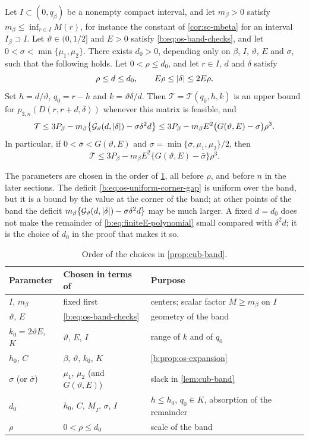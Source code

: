 \begin{proposition}\label{prop:cub-band}
Let $I\subset(0,q_\beta)$ be a nonempty compact interval, and let $m_\beta>0$
satisfy $m_\beta\le\inf_{r\in I}M(r)$, for instance the constant of
\cref{cor:sc-mbeta} for an interval $I_\beta\supset I$. Let $\vartheta\in(0,1/2]$ and
$E>0$ satisfy \eqref{b:eq:os-band-checks}, and let $0<\sigma<\min\{\mu_1,\mu_2\}$.
There exists $d_0>0$, depending only on $\beta$, $I$, $\vartheta$, $E$ and $\sigma$,
such that the following holds. Let $0<\rho\le d_0$, and let $r\in I$, $d$ and
$\delta$ satisfy
\[
 \rho\le d\le d_0,\qquad E\rho\le\lvert \delta\rvert\le2E\rho .
\]
Set $h=d/\vartheta$, $q_0=r-h$ and $k=\vartheta\delta/d$. Then $\mathcal
T=\mathcal T(q_0,h,k)$ is an upper bound for $p_{3,n}(D(r,r+d,\delta))$
whenever this matrix is feasible, and
\[
 \mathcal T\le3P_\beta-m_\beta\bigl\{\mathcal G_\vartheta(d,\lvert \delta\rvert)-\sigma\delta^2d\bigr\}
 \le3P_\beta-m_\beta E^2\bigl(G(\vartheta,E)-\sigma\bigr)\rho^3.
\]
In particular, if $0<\bar\sigma<G(\vartheta,E)$ and $\sigma=\min\{\bar\sigma,\mu_1,\mu_2\}/2$,
then
\begin{equation}\label{b:eq:os-uniform-corner-gap}
 \mathcal T\le3P_\beta-m_\beta E^2\bigl\{G(\vartheta,E)-\bar\sigma\bigr\}\rho^3 .
\end{equation}
\end{proposition}

The parameters are chosen in the order of \cref{tab:cub-choices}, all before
$\rho$, and before $n$ in the later sections. The deficit
\eqref{b:eq:os-uniform-corner-gap} is uniform over the band, but it is a bound
by the value at the corner of the band; at other points of the band the
deficit $m_\beta\{\mathcal G_\vartheta(d,\lvert \delta\rvert)-\sigma\delta^2d\}$ may be much
larger. A fixed $d=d_0$ does not make the remainder of
\eqref{b:eq:finiteE-polynomial} small compared with $\delta^2d$; it is the
choice of $d_0$ in the proof that makes it so.

\begin{table}[ht]
\centering
\begin{tabular}{@{}lll@{}}
\toprule
Parameter & Chosen in terms of & Purpose\\
\midrule
$I$, $m_\beta$ & fixed first & centers; scalar factor $M\ge m_\beta$ on $I$\\
$\vartheta$, $E$ & \eqref{b:eq:os-band-checks} & geometry of the band\\
$k_0=2\vartheta E$, $K$ & $\vartheta$, $E$, $I$ & range of $k$ and of $q_0$\\
$h_0$, $C$ & $\beta$, $\vartheta$, $k_0$, $K$ & \cref{b:prop:os-expansion}\\
$\sigma$ (or $\bar\sigma$) & $\mu_1$, $\mu_2$ (and $G(\vartheta,E)$) & slack in \cref{lem:cub-band}\\
$d_0$ & $h_0$, $C$, $\underline M_I$, $\sigma$, $I$ & $h\le h_0$, $q_0\in K$, absorption of the remainder\\
$\rho$ & $0<\rho\le d_0$ & scale of the band\\
\bottomrule
\end{tabular}
\caption{Order of the choices in \cref{prop:cub-band}.}\label{tab:cub-choices}
\end{table}

